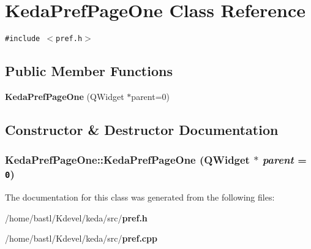 \section{Keda\-Pref\-Page\-One Class Reference}
\label{classKedaPrefPageOne}
{\tt \#include $<$pref.h$>$}

\subsection*{Public Member Functions}
\begin{CompactItemize}
\item 
{\bf Keda\-Pref\-Page\-One} (QWidget $\ast$parent=0)
\end{CompactItemize}


\subsection{Constructor \& Destructor Documentation}
\subsubsection{\setlength{\rightskip}{0pt plus 5cm}Keda\-Pref\-Page\-One::Keda\-Pref\-Page\-One (QWidget $\ast$ {\em parent} = {\tt 0})}\label{classKedaPrefPageOne_f843ca0308adf25b90eb4e087b7bedf3}




The documentation for this class was generated from the following files:\begin{CompactItemize}
\item 
/home/bastl/Kdevel/keda/src/{\bf pref.h}\item 
/home/bastl/Kdevel/keda/src/{\bf pref.cpp}\end{CompactItemize}
